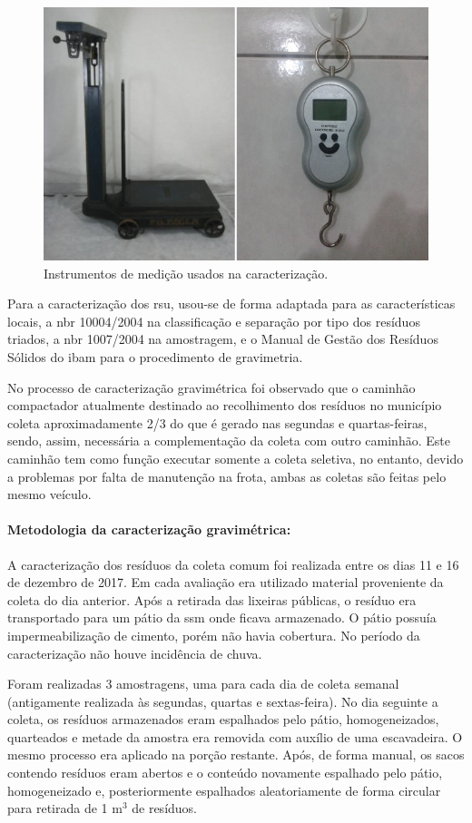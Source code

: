 \begin{figure}
	\centering
	\includegraphics[width=0.7\linewidth]{produtos/prodtres/image021_22}
	\caption{Instrumentos de medição usados na caracterização.}
	\label{fig:image021_22}
\end{figure}


Para a caracterização dos \gls{rsu}, usou-se de forma adaptada para as características locais, a \gls{nbr} 10004/2004 na classificação e separação por tipo dos resíduos triados, a \gls{nbr} 1007/2004 na amostragem, e o Manual de Gestão dos Resíduos Sólidos do \gls{ibam} para o procedimento de gravimetria.

No processo de caracterização gravimétrica foi observado que o caminhão compactador atualmente destinado ao recolhimento dos resíduos no município coleta aproximadamente 2/3 do que é gerado nas segundas e quartas-feiras, sendo, assim, necessária a complementação da coleta com outro caminhão. Este caminhão tem como função executar somente a coleta seletiva, no entanto, devido a problemas por falta de manutenção na frota, ambas as coletas são feitas pelo mesmo veículo.

\paragraph{\textbf{Metodologia da caracterização gravimétrica:}}

A caracterização dos resíduos da coleta comum foi realizada entre os dias 11 e 16 de dezembro de 2017. Em cada avaliação era utilizado material proveniente da coleta do dia anterior. Após a retirada das lixeiras públicas, o resíduo era transportado para um pátio da \gls{ssm} onde ficava armazenado. O pátio possuía impermeabilização de cimento, porém não havia cobertura. No período da caracterização não houve incidência de chuva.

Foram realizadas 3 amostragens, uma para cada dia de coleta semanal (antigamente realizada às segundas, quartas e sextas-feira). No dia seguinte a coleta, os resíduos armazenados eram espalhados pelo pátio, homogeneizados, quarteados e metade da amostra era removida com auxílio de uma escavadeira. O mesmo processo era aplicado na porção restante. Após, de forma manual, os sacos contendo resíduos eram abertos e o conteúdo novamente espalhado pelo pátio, homogeneizado e, posteriormente espalhados aleatoriamente de forma circular para retirada de 1 m$^{3}$ de resíduos.

